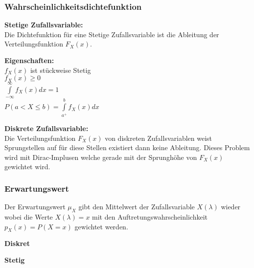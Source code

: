 \subsubsection{Wahrscheinlichkeitsdichtefunktion}
\begin{minipage}[t]{0.48\textwidth}
	\textbf{Stetige Zufallsvariable:}\\
	Die Dichtefunktion für eine Stetige Zufallsvariable ist die Ableitung der Verteilungsfunktion $F_X(x)$.
	\begin{center}
	\end{center}
\textbf{Eigenschaften:}\\
$f_X(x)$ ist stückweise Stetig\\
$f_X(x) \ge 0$\\
$\int\limits_{-\infty}^{\infty} f_X(x) dx = 1$\\
$P(a < X \le b) = \int\limits_{a^+}^{b} f_X(x) dx$
\end{minipage} \hspace{0.04\textwidth}
\begin{minipage}[t]{0.48\textwidth}
	\textbf{Diskrete Zufallsvariable:}\\
	Die Verteilungsfunktion $F_X(x)$ von diskreten Zufallsvariablen weist Sprungstellen auf für diese Stellen existiert dann keine Ableitung. Dieses Problem wird mit Dirac-Implusen welche gerade mit der Sprunghöhe von $F_X(x)$ gewichtet wird.
	\begin{center}
	\end{center}
\end{minipage}

\subsubsection{Erwartungswert}
Der Erwartungswert $\mu_X$ gibt den Mittelwert der Zufallsvariable $X(\lambda)$ wieder wobei die Werte $X(\lambda) = x$ mit den Auftretungswahrscheinlichkeit $p_X(x) = P(X=x)$ gewichtet werden.\\[3pt]
\begin{minipage}[t]{0.48\textwidth}
	\textbf{Diskret}\\
\end{minipage} \hspace{0.04\textwidth}
\begin{minipage}[t]{0.48\textwidth}
	\textbf{Stetig}\\
\end{minipage}

